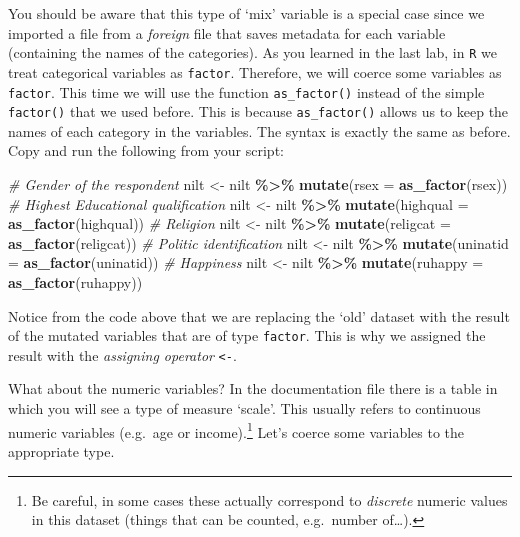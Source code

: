 \documentclass[
]{book}
\newenvironment{Shaded}{\begin{snugshade}}{\end{snugshade}}
\newcommand{\AttributeTok}[1]{\textcolor[rgb]{0.13,0.29,0.53}{#1}}
\newcommand{\CommentTok}[1]{\textcolor[rgb]{0.56,0.35,0.01}{\textit{#1}}}
\newcommand{\FunctionTok}[1]{\textcolor[rgb]{0.13,0.29,0.53}{\textbf{#1}}}
\newcommand{\NormalTok}[1]{#1}
\newcommand{\OtherTok}[1]{\textcolor[rgb]{0.56,0.35,0.01}{#1}}
\newcommand{\SpecialCharTok}[1]{\textcolor[rgb]{0.81,0.36,0.00}{\textbf{#1}}}
\begin{document}
You should be aware that this type of `mix' variable is a special case since we imported a file from a \emph{foreign} file that saves metadata for each variable (containing the names of the categories). As you learned in the last lab, in \texttt{R} we treat categorical variables as \texttt{factor}. Therefore, we will coerce some variables as \texttt{factor}. This time we will use the function \texttt{as\_factor()} instead of the simple \texttt{factor()} that we used before. This is because \texttt{as\_factor()} allows us to keep the names of each category in the variables. The syntax is exactly the same as before. Copy and run the following from your script:

\begin{Shaded}
\begin{Highlighting}[]
\CommentTok{\# Gender of the respondent}
\NormalTok{nilt }\OtherTok{\textless{}{-}}\NormalTok{ nilt }\SpecialCharTok{\%\textgreater{}\%} \FunctionTok{mutate}\NormalTok{(}\AttributeTok{rsex =} \FunctionTok{as\_factor}\NormalTok{(rsex))}
\CommentTok{\# Highest Educational qualification}
\NormalTok{nilt }\OtherTok{\textless{}{-}}\NormalTok{ nilt }\SpecialCharTok{\%\textgreater{}\%} \FunctionTok{mutate}\NormalTok{(}\AttributeTok{highqual =} \FunctionTok{as\_factor}\NormalTok{(highqual))}
\CommentTok{\# Religion}
\NormalTok{nilt }\OtherTok{\textless{}{-}}\NormalTok{ nilt }\SpecialCharTok{\%\textgreater{}\%} \FunctionTok{mutate}\NormalTok{(}\AttributeTok{religcat =} \FunctionTok{as\_factor}\NormalTok{(religcat))}
\CommentTok{\# Politic identification}
\NormalTok{nilt }\OtherTok{\textless{}{-}}\NormalTok{ nilt }\SpecialCharTok{\%\textgreater{}\%} \FunctionTok{mutate}\NormalTok{(}\AttributeTok{uninatid =} \FunctionTok{as\_factor}\NormalTok{(uninatid))}
\CommentTok{\# Happiness}
\NormalTok{nilt }\OtherTok{\textless{}{-}}\NormalTok{ nilt }\SpecialCharTok{\%\textgreater{}\%} \FunctionTok{mutate}\NormalTok{(}\AttributeTok{ruhappy =} \FunctionTok{as\_factor}\NormalTok{(ruhappy))}
\end{Highlighting}
\end{Shaded}

Notice from the code above that we are replacing the `old' dataset with the result of the mutated variables that are of type \texttt{factor}. This is why we assigned the result with the \emph{assigning operator} \texttt{\textless{}-}.

What about the numeric variables? In the documentation file there is a table in which you will see a type of measure `scale'. This usually refers to continuous numeric variables (e.g.~age or income).\footnote{Be careful, in some cases these actually correspond to \emph{discrete} numeric values in this dataset (things that can be counted, e.g.~number of\ldots).} Let's coerce some variables to the appropriate type.
\end{document}

